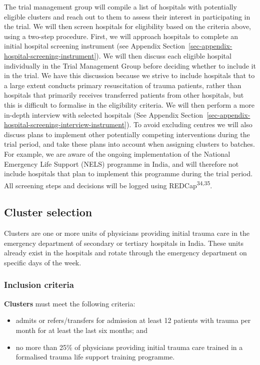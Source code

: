 \documentclass[
]{scrartcl}
\providecommand{\tightlist}{%
  \setlength{\itemsep}{0pt}\setlength{\parskip}{0pt}}\usepackage{longtable,booktabs,array}
\begin{document}
The trial management group will compile a list of hospitals with
potentially eligible clusters and reach out to them to assess their
interest in participating in the trial. We will then screen hospitals
for eligibility based on the criteria above, using a two-step procedure.
First, we will approach hospitals to complete an initial hospital
screening instrument (see Appendix
Section~\ref{sec-appendix-hospital-screening-instrument}). We will then
discuss each eligible hospital individually in the Trial Management
Group before deciding whether to include it in the trial. We have this
discussion because we strive to include hospitals that to a large extent
conducts primary resuscitation of trauma patients, rather than hospitals
that primarily receives transferred patients from other hospitals, but
this is difficult to formalise in the eligibility criteria. We will then
perform a more in-depth interview with selected hospitals (See Appendix
Section~\ref{sec-appendix-hospital-screening-interview-instrument}). To
avoid excluding centres we will also discuss plans to implement other
potentially competing interventions during the trial period, and take
these plans into account when assigning clusters to batches. For
example, we are aware of the ongoing implementation of the National
Emergency Life Support (NELS) programme in India, and will therefore not
include hospitals that plan to implement this programme during the trial
period. All screening steps and decisions will be logged using
REDCap\textsuperscript{34,35}.

\hypertarget{cluster-selection}{%
\subsection{Cluster selection}\label{cluster-selection}}

Clusters are one or more units of physicians providing initial trauma
care in the emergency department of secondary or tertiary hospitals in
India. These units already exist in the hospitals and rotate through the
emergency department on specific days of the week.

\hypertarget{inclusion-criteria}{%
\subsubsection{Inclusion criteria}\label{inclusion-criteria}}

\textbf{Clusters} must meet the following criteria:

\begin{itemize}
\tightlist
\item
  admits or refers/transfers for admission at least 12 patients with
  trauma per month for at least the last six months; and
\item
  no more than 25\% of physicians providing initial trauma care trained
  in a formalised trauma life support training programme.
\end{itemize}
\end{document}
